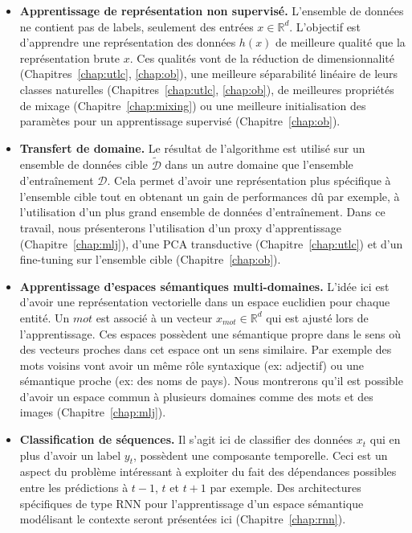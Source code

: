 \begin{itemize}

\item {\bf Apprentissage de représentation non supervisé.} L'ensemble de
données ne contient pas de labels, seulement des entrées $x\in\mathbb{R}^{d}$.
L'objectif est d'apprendre une représentation des données $h(x)$ de meilleure
qualité que la représentation brute $x$.  Ces qualités vont de la réduction de
dimensionnalité (Chapitres~\ref{chap:utlc}, \ref{chap:ob}), une meilleure
séparabilité linéaire de leurs classes naturelles (Chapitres~\ref{chap:utlc}, \ref{chap:ob}), de meilleures
propriétés de mixage (Chapitre~\ref{chap:mixing}) ou une meilleure
initialisation des paramètes pour un apprentissage supervisé
(Chapitre~\ref{chap:ob}). 
\\

\item {\bf Transfert de domaine.} Le résultat de l'algorithme est utilisé sur
un ensemble de données cible $\tilde{\mathcal{D}}$ dans un autre domaine que l'ensemble
d'entraînement $\mathcal{D}$. Cela permet d'avoir une représentation plus
spécifique à l'ensemble cible tout en obtenant un gain de performances dû par
exemple, à l'utilisation d'un plus grand ensemble de données d'entraînement.
Dans ce travail, nous présenterons l'utilisation d'un proxy d'apprentissage
(Chapitre~\ref{chap:mlj}), d'une PCA transductive (Chapitre~\ref{chap:utlc}) et
d'un fine-tuning sur l'ensemble cible (Chapitre~\ref{chap:ob}).
\\

\item {\bf Apprentissage d'espaces sémantiques multi-domaines.} L'idée ici est
d'avoir une représentation vectorielle dans un espace euclidien pour chaque entité. Un
$mot$ est associé à un vecteur $x_{mot}\in\mathbb{R}^{d}$ qui est ajusté lors de l'apprentissage.
Ces espaces possèdent une sémantique propre dans le sens où des vecteurs proches
dans cet espace ont un sens similaire. Par exemple des mots voisins vont avoir
un même rôle syntaxique (ex: adjectif) ou une sémantique proche (ex: des noms de pays).
Nous montrerons qu'il est possible d'avoir un espace commun à plusieurs domaines
comme des mots et des images (Chapitre~\ref{chap:mlj}).
\\

\item {\bf Classification de séquences.} Il s'agit ici de classifier des
données $x_{t}$ qui en plus d'avoir un label $y_{t}$, possèdent une composante
temporelle. Ceci est un aspect du problème intéressant à exploiter du fait des
dépendances possibles entre les prédictions à $t-1$, $t$ et $t+1$ par exemple.
Des architectures spécifiques de type RNN pour l'apprentissage d'un espace
sémantique modélisant le contexte seront présentées ici
(Chapitre~\ref{chap:rnn}).

\end{itemize}

